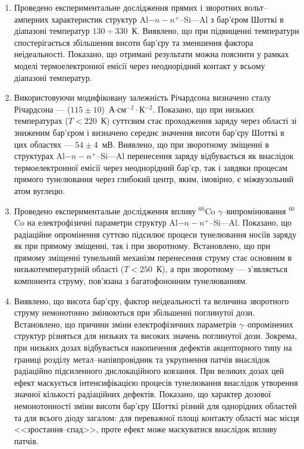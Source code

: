   \begin{enumerate}[leftmargin=0cm,itemindent=3em]
     \item Проведено експериментальне дослідження прямих і зворотних вольт--амперних характеристик структур Al$-n-n^+$--Si---Al з бар'єром Шотткі в діапазоні температур $130\div330$~К.
Виявлено, що при підвищенні температури спостерігається збільшення висоти бар'єру та зменшення фактора неідеальності.
       Показано, що отримані результати можна пояснити у рамках моделі термоелектронної емісії через неоднорідний контакт у всьому діапазоні температур.

     \item Використовуючи модифіковану залежність Річардсона визначено сталу Річардсона --- ($115\pm10$)~А$\cdot$см$^{-2}\cdot$К$^{-2}$.
         Показано, що при низьких температурах ($T<220$~К) суттєвим стає проходження заряду через області зі зниженим бар'єром і визначено середнє значення висоти бар'єру Шотткі в цих областях --- $54\pm4$~мВ.
     Виявлено, що при зворотному зміщенні в структурах Al$-n-n^+$--Si---Al перенесення заряду відбувається як внаслідок термоелектронної емісії через неоднорідний бар'єр, так і завдяки процесам прямого тунелювання через глибокий центр,
          яким, імовірно, є міжвузольний атом вуглецю.

\item Проведено експериментальне дослідження впливу $^{60}$Co $\gamma$--ви\-про\-мі\-ню\-ван\-ня $^{60}$Co на електрофізичні параметри структур Al$-n-n^+$--Si---Al.
     Показано, що радіаційне опромінення суттєво підсилює процеси тунелювання носіїв заряду як при прямому зміщенні, так і при зворотному.
     Встановлено, що при прямому зміщенні тунельний механізм перенесення струму стає основним в низькотемпературній області ($T<250$~К),
а при зворотному --- з'являється компонента струму, пов'язана з багатофононним тунелюванням.


\item Виявлено, що висота бар'єру, фактор неідеальності та величина зворотного струму немонотонно змінюються при збільшенні поглинутої дози.
Встановлено, що причини зміни електрофізичних параметрів $\gamma$--оп\-ро\-мі\-не\-них структур різняться для низьких та високих значень поглинутої дози.
      Зокрема, при низьких дозах відбувається накопичення дефектів акцепторного типу на границі розділу
метал--напівпровідник та укрупнення патчів внаслідок радіаційно підсиленного дислокаційного ковзання.
 При великих дозах цей ефект маскується інтенсифікацією процесів тунелювання внаслідок утворення значної кількості радіаційних дефектів.
Показано, що характер дозової немонотонності зміни висоти бар'єру Шотткі різний для
      однорідних областей та для всього діоду загалом:
   для переважної площі контакту області має місця <<зростання--спад>>, проте ефект може маскуватися внаслідок впливу патчів.



\end{enumerate}
